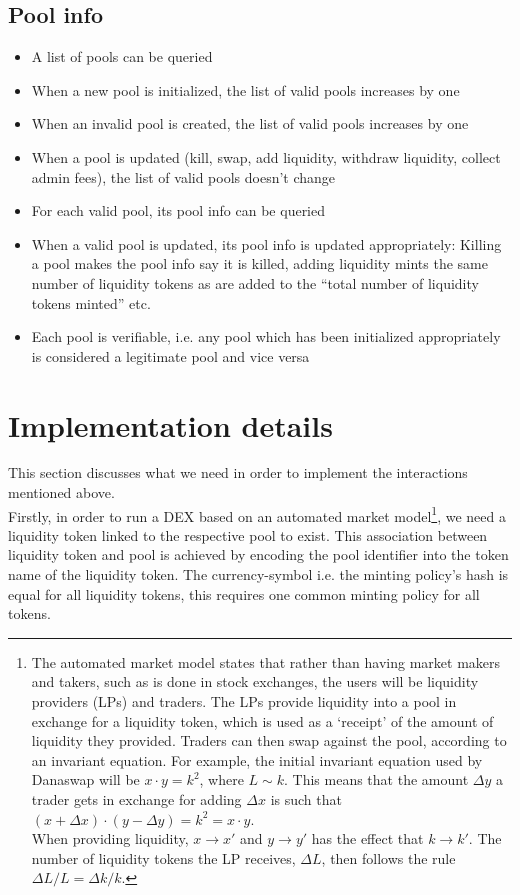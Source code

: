 \documentclass{article}
\begin{document}
\subsection*{Pool info}

\begin{itemize}
  \item A list of pools can be queried
  \item When a new pool is initialized, the list of valid pools increases by one
  \item When an invalid pool is created, the list of valid pools increases by
    one
  \item When a pool is updated (kill, swap, add liquidity, withdraw liquidity,
    collect admin fees), the list of valid pools doesn't change
  \item For each valid pool, its pool info can be queried
  \item When a valid pool is updated, its pool info is updated appropriately:
    Killing a pool makes the pool info say it is killed, adding liquidity mints
    the same number of liquidity tokens as are added to the ``total number of
    liquidity tokens minted'' etc.
  \item Each pool is verifiable, i.e. any pool which has been initialized
    appropriately is considered a legitimate pool and vice versa
\end{itemize}

\section{Implementation details}

This section discusses what we need in order to implement the interactions
mentioned above. \\

Firstly, in order to run a DEX based on an automated market model\footnote{
  The automated market model states that rather than having market makers and
  takers, such as is done in stock exchanges, the users will be liquidity
  providers (LPs) and traders. The LPs provide liquidity into a pool in exchange
  for a liquidity token, which is used as a `receipt' of the amount of liquidity
  they provided. Traders can then swap against the pool, according to an
  invariant equation. For example, the initial invariant equation used by
  Danaswap will be $x \cdot y = k^2$, where $L \sim k$. This means that the
  amount $\Delta y$ a trader gets in exchange for adding $\Delta x$ is such that
  $(x + \Delta x) \cdot (y - \Delta y) = k^2 = x \cdot y$. \\

  When providing liquidity, $x \rightarrow x'$ and $y \rightarrow y'$ has the
  effect that $k \rightarrow k'$. The number of liquidity tokens the LP
  receives, $\Delta L$, then follows the rule $\Delta L / L = \Delta k / k$.
}, we need a liquidity token linked to the respective pool to exist. This association between liquidity token and pool is achieved by encoding the pool identifier into the token name of the liquidity token. The currency-symbol i.e. the minting policy's hash is equal for all liquidity tokens, this requires one common minting policy for all tokens.
\end{document}
